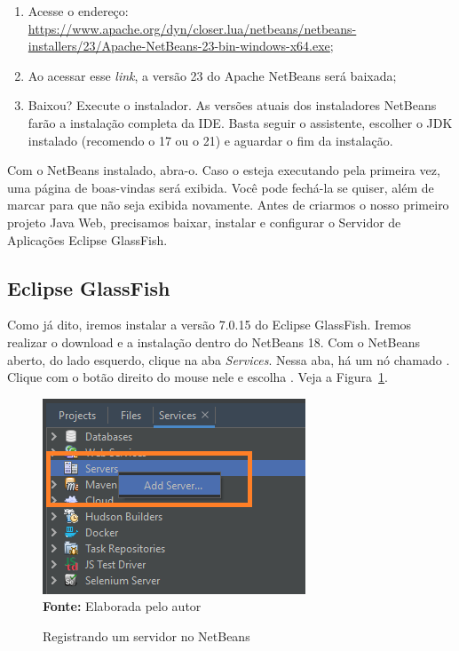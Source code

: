 \begin{enumerate}

    \item Acesse o endereço: \url{https://www.apache.org/dyn/closer.lua/netbeans/netbeans-installers/23/Apache-NetBeans-23-bin-windows-x64.exe};
    
    \item Ao acessar esse \textit{link}, a versão 23 do Apache NetBeans será baixada;
    
    \item Baixou? Execute o instalador. As versões atuais dos instaladores NetBeans farão a instalação completa da IDE. Basta seguir o assistente, escolher o JDK instalado (recomendo o 17 ou o 21) e aguardar o fim da instalação.
    
\end{enumerate}

Com o NetBeans instalado, abra-o. Caso o esteja executando pela primeira vez, uma página de boas-vindas será exibida. Você pode fechá-la se quiser, além de marcar para que não seja exibida novamente. Antes de criarmos o nosso primeiro projeto Java Web, precisamos baixar, instalar e configurar o Servidor de Aplicações Eclipse GlassFish.


\subsection{Eclipse GlassFish}

Como já dito, iremos instalar a versão 7.0.15 do Eclipse GlassFish. Iremos realizar o download e a instalação dentro do NetBeans 18. Com o NetBeans aberto, do lado esquerdo, clique na aba \textit{Services}. Nessa aba, há um nó chamado . Clique com o botão direito do mouse nele e escolha . Veja a Figura~\ref{fig:cap01Servers}.

\FloatBarrier
\begin{figure}[!htbp]
    \centering
    \caption{Registrando um servidor no NetBeans}
    \includegraphics[scale=0.7]{imagens/cap01Servers}
    \\\textbf{Fonte:} Elaborada pelo autor
    \label{fig:cap01Servers}
\end{figure}
\FloatBarrier

